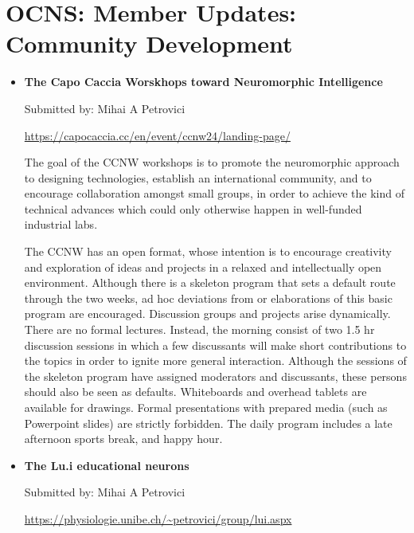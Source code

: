 \section*{OCNS: Member Updates: Community Development}%

\begin{itemize}
    \item \textbf{The Capo Caccia Worskhops toward Neuromorphic Intelligence}

        Submitted by: Mihai A Petrovici

        \url{https://capocaccia.cc/en/event/ccnw24/landing-page/}

        The goal of the CCNW workshops is to promote the neuromorphic approach to designing technologies, establish an international community, and to encourage collaboration amongst small groups, in order to achieve the kind of technical advances which could only otherwise happen in well-funded industrial labs.

        The CCNW has an open format, whose intention is to encourage creativity and exploration of ideas and projects in a relaxed and intellectually open environment. Although there is a skeleton program that sets a default route through the two weeks, ad hoc deviations from or elaborations of this basic program are encouraged. Discussion groups and projects arise dynamically. There are no formal lectures. Instead, the morning consist of two 1.5 hr discussion sessions in which a few discussants will make short contributions to the topics in order to ignite more general interaction. Although the sessions of the skeleton program have assigned moderators and discussants, these persons should also be seen as defaults. Whiteboards and overhead tablets are available for drawings. Formal presentations with prepared media (such as Powerpoint slides) are strictly forbidden. The daily program includes a late afternoon sports break, and happy hour.


    \item \textbf{The Lu.i educational neurons}

        Submitted by: Mihai A Petrovici

        \url{https://physiologie.unibe.ch/~petrovici/group/lui.aspx}


\end{itemize}
